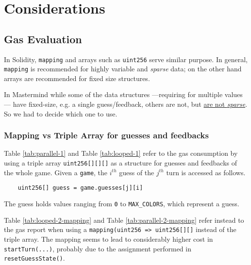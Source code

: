 \chapter{Considerations}

\section{Gas Evaluation}
\label{sec:gas_report}

In Solidity, \lstinline{mapping} and arrays such as \lstinline{uint256} serve similar purpose.
In general, \lstinline{mapping} is recommended for highly variable and \textit{sparse} data; 
on the other hand arrays are recommended for fixed size structures.

In Mastermind while some of the data structures {---}requiring for multiple values{---} have fixed-size, e.g. a single guess/feedback, others are not, but \ul{are not \textit{sparse}}.
So we had to decide which one to use.



\subsection{Mapping vs Triple Array for guesses and feedbacks }

Table \ref{tab:parallel-1} and Table \ref{tab:looped-1} refer to the gas consumption by using a triple array \lstinline{uint256[][][]} as a structure for guesses and feedbacks of the whole game.
Given a \texttt{game}, the $i^{th}$ guess of the $j^{th}$ turn is accessed as follows.
\begin{lstlisting}
    uint256[] guess = game.guesses[j][i]
\end{lstlisting}
The guess holds values ranging from \lstinline{0} to \lstinline{MAX_COLORS}, which represent a guess.

Table \ref{tab:looped-2-mapping} and Table \ref{tab:parallel-2-mapping} refer instead to the gas report when using a \lstinline{mapping(uint256 => uint256[][]} instead of the triple array.
The mapping seems to lead to considerably higher cost in \texttt{startTurn(...)}, probably due to the assignment performed in \texttt{resetGuessState()}.

